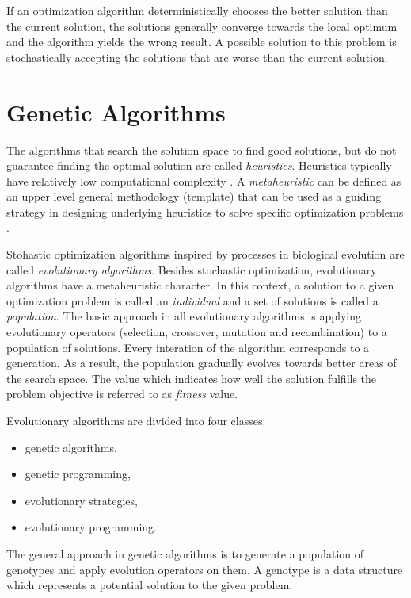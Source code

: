 If an optimization algorithm deterministically chooses the better solution than the current solution, the solutions generally converge towards the local optimum and the algorithm yields the wrong result.
A possible solution to this problem is stochastically accepting the solutions that are worse than the current solution.

\section{Genetic Algorithms}

The algorithms that search the solution space to find good solutions, but do not guarantee finding the optimal solution are called \textit{heuristics}. 
Heuristics typically have relatively low computational complexity \cite{cupic2013prirodom}.
A \textit{metaheuristic} can be defined as an upper level general methodology (template) that can be used as a guiding strategy in designing underlying heuristics to solve specific optimization problems \cite{talbi2009metaheuristics}.

Stohastic optimization algorithms inspired by processes in biological evolution are called \textit{evolutionary algorithms}.
Besides stochastic optimization, evolutionary algorithms have a metaheuristic character.
In this context, a solution to a given optimization problem is called an \textit{individual} and a set of solutions is called a \textit{population}.
The basic approach in all evolutionary algorithms is applying evolutionary operators (selection, crossover, mutation and recombination) to a population of solutions.
Every interation of the algorithm corresponds to a generation.
As a result, the population gradually evolves towards better areas of the search space. 
The value which indicates how well the solution fulfills the problem objective is referred to as \textit{fitness} value.

Evolutionary algorithms are divided into four classes: 
\begin{itemize}
    \item genetic algorithms,
    \item genetic programming,
    \item evolutionary strategies,
    \item evolutionary programming.
\end{itemize}

The general approach in genetic algorithms is to generate a population of genotypes and apply evolution operators on them.
A genotype is a data structure which represents a potential solution to the given problem.

